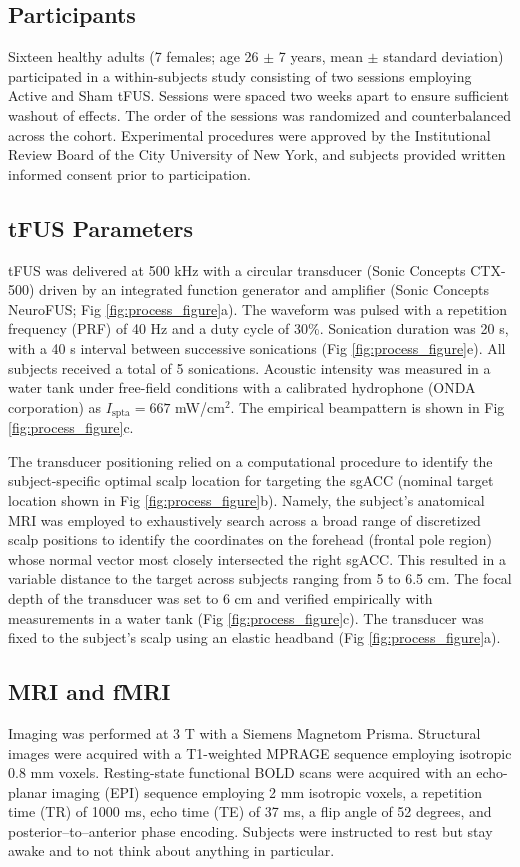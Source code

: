 \subsection*{Participants}
\noindent
Sixteen healthy adults (7 females; age 26 $\pm$ 7 years, mean $\pm$ standard deviation) participated in a within-subjects study consisting of two sessions employing Active and Sham tFUS. Sessions were spaced two weeks apart to ensure sufficient washout of effects. The order of the sessions was randomized and counterbalanced across the cohort. Experimental procedures were approved by the Institutional Review Board of the City University of New York, and subjects provided written informed consent prior to participation. 

\subsection*{tFUS Parameters}
\noindent
tFUS was delivered at 500 kHz with a circular transducer (Sonic Concepts CTX-500) driven by an integrated function generator and amplifier (Sonic Concepts NeuroFUS; Fig \ref{fig:process_figure}a). The waveform was pulsed with a repetition frequency (PRF) of 40 Hz and a duty cycle of 30\%. Sonication duration was 20 s, with a 40 s interval between successive sonications (Fig \ref{fig:process_figure}e). All subjects received a total of 5 sonications. Acoustic intensity was measured in a water tank under free-field conditions with a calibrated hydrophone (ONDA corporation) as $I_{\mathrm{spta}} = 667$ mW/cm$^2$. The empirical beampattern is shown in Fig \ref{fig:process_figure}c.

The transducer positioning relied on a computational procedure to identify the subject-specific optimal scalp location for targeting the sgACC (nominal target location shown in Fig \ref{fig:process_figure}b). Namely, the subject’s anatomical MRI was employed to exhaustively search across a broad range of discretized scalp positions to identify the coordinates on the forehead (frontal pole region) whose normal vector most closely intersected the right sgACC. This resulted in a variable distance to the target across subjects ranging from 5 to 6.5 cm. The focal depth of the transducer was set to 6 cm and verified empirically with measurements in a water tank (Fig \ref{fig:process_figure}c). The transducer was fixed to the subject's scalp using an elastic headband (Fig \ref{fig:process_figure}a). 

\subsection*{MRI and fMRI}
\noindent
Imaging was performed at 3 T with a Siemens Magnetom Prisma. Structural images were acquired with a T1-weighted MPRAGE sequence employing isotropic 0.8 mm voxels. Resting-state functional BOLD scans were acquired with an echo-planar imaging (EPI) sequence employing 2 mm isotropic voxels, a repetition time (TR) of 1000 ms, echo time (TE) of 37 ms, a flip angle of 52 degrees, and posterior–to–anterior phase encoding. Subjects were instructed to rest but stay awake and to not think about anything in particular.


